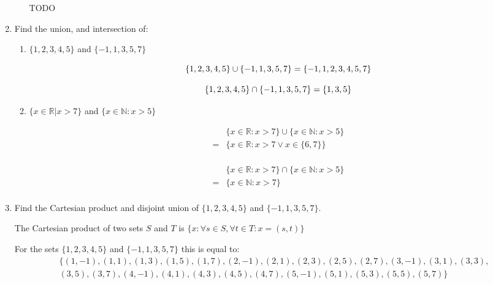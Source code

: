 \documentclass[10pt,\jkfside,a4paper]{article}
\begin{document}
\begin{enumerate}
\begin{enumerate}
TODO

\end{enumerate}

\item Find the union, and intersection of: 

\begin{enumerate}

\item $\{1, 2, 3, 4, 5\}$ and $\{-1, 1, 3, 5, 7\}$

\begin{equation}
\{1, 2, 3, 4, 5\} \cup \{-1, 1, 3, 5, 7\} = \{-1, 1, 2, 3, 4, 5, 7\}\\
\end{equation}

\begin{equation}
\{1, 2, 3, 4, 5\} \cap \{-1, 1, 3, 5, 7\} = \{1, 3, 5\}\\
\end{equation}

\item $\{x \in \mathbb{R}| x > 7\}$ and $\{ x \in \mathbb{N}: x > 5\}$

\begin{equation}
\begin{split}
 & \{x \in \mathbb{R}: x > 7\} \cup \{ x \in \mathbb{N}: x > 5\}\\
=& \{x \in \mathbb{R}: x > 7 \vee x \in \{6, 7\}\}\\
\end{split}
\end{equation}

\begin{equation}
\begin{split}
 & \{x \in \mathbb{R}: x > 7\} \cap \{ x \in \mathbb{N}: x > 5\}\\
=& \{x \in \mathbb{N}: x > 7\}\\
\end{split}
\end{equation}

\end{enumerate}

\item Find the Cartesian product and disjoint union of $\{1, 2, 3, 4, 5\}$ and $\{-1, 1, 3, 5, 7\}$.

The Cartesian product of two sets $S$ and $T$ is $\{x: \forall s \in S, \forall t \in T: x = (s, t)\}$

For the sets $\{1, 2, 3, 4, 5\}$ and $\{-1, 1, 3, 5, 7\}$ this is equal to:
\begin{equation}
\begin{split}
&\{(1, -1), (1, 1), (1, 3), (1, 5), (1, 7), (2, -1), (2, 1), (2, 3), (2, 5), (2, 7), (3, -1), (3, 1), (3, 3), \\&(3, 5), (3, 7), (4, -1), (4, 1), (4, 3), (4, 5), (4, 7), (5, -1), (5, 1), (5, 3), (5, 5), (5, 7)\}\\
\end{split}
\end{equation}


\end{enumerate}
\end{document}
